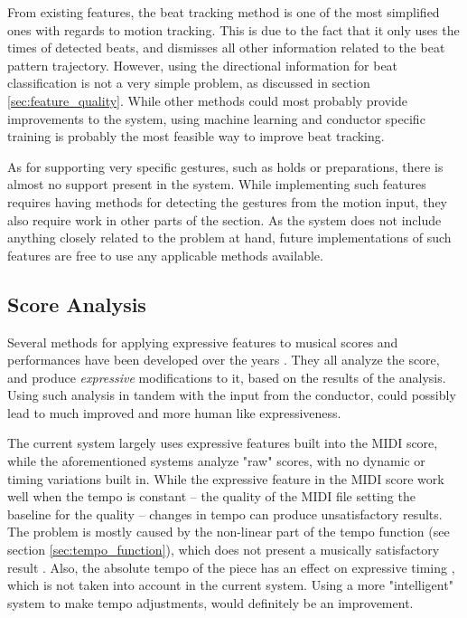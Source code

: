 From existing features,
the beat tracking method is one of the most
simplified ones with regards to motion tracking.
This is due to the fact that it only uses
the times of detected beats,
and dismisses all other information
related to the beat pattern trajectory.
However, using the directional information
for beat classification is not a very simple problem,
as discussed in section \ref{sec:feature_quality}.
While other methods could most probably provide
improvements to the system,
using machine learning and conductor specific training
is probably the most feasible way to improve beat tracking.

As for supporting very specific gestures,
such as holds or preparations,
there is almost no support present in the system.
While implementing such features requires
having methods for detecting the gestures
from the motion input,
they also require work in other parts of the section.
As the system does not include anything
closely related to the problem at hand,
future implementations of such features
are free to use any applicable methods available.

\subsection{Score Analysis}

Several methods for applying expressive features
to musical scores and performances
have been developed over the years \cite{Kirke2012}.
They all analyze the score,
and produce \textit{expressive} modifications to it,
based on the results of the analysis.
Using such analysis in tandem with
the input from the conductor,
could possibly lead to much improved and
more human like expressiveness.

The current system largely uses expressive features
built into the MIDI score,
while the aforementioned systems analyze "raw" scores,
with no dynamic or timing variations built in.
While the expressive feature in the MIDI score
work well when the tempo is constant --
the quality of the MIDI file setting the baseline for the quality --
changes in tempo can produce unsatisfactory results.
The problem is mostly caused by the
non-linear part of the tempo function
(see section \ref{sec:tempo_function}),
which does not present a musically
satisfactory result \cite{Kirke2012, Desain1993}.
Also, the absolute tempo of the piece has an effect
on expressive timing \cite{Desain1994},
which is not taken into account in the current system.
Using a more "intelligent" system to make tempo adjustments,
would definitely be an improvement.

